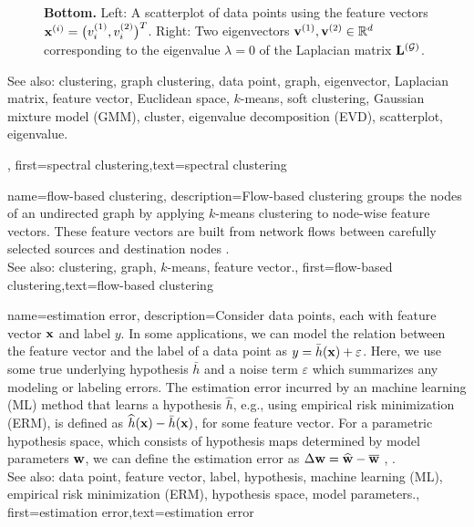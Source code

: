 {{\begin{figure}[H]
\begin{center}
{					{\bf Bottom.} Left: A scatterplot of data points using the feature vectors 
					${\bf x}^{(i)} = \big( v^{(1)}_{i},v^{(2)}_{i} \big)^{T}$. 
					Right: Two eigenvectors ${\bf v}^{(1)},{\bf v}^{(2)} \in \mathbb{R}^{d}$ 
					corresponding to the eigenvalue $\lambda=0$ of the Laplacian matrix ${\bf L}^{(\mathcal{G})}$. 
					} 
			\end{center}
		\end{figure}
		See also: clustering, graph clustering, data point, graph, eigenvector, Laplacian matrix, feature vector, Euclidean space, $k$-means, soft clustering, Gaussian mixture model (GMM), cluster, eigenvalue decomposition (EVD), scatterplot, eigenvalue.
	\newpage}, 
	first={spectral clustering},text={spectral clustering} 
}

{name={flow-based clustering},
	description={Flow-based clustering groups the nodes 
		of an undirected graph by applying $k$-means clustering to node-wise 
		feature vectors. These feature vectors are built from network flows between 
		carefully selected sources and destination nodes \cite{FlowSpecClustering2021}. 
					\\ 
		See also: clustering, graph, $k$-means, feature vector.}, 
	first={flow-based clustering},text={flow-based clustering} 
}



{name={estimation error},
	description={Consider data points, each with feature vector ${\bf x}$ and label 
		$y$. In some applications, we can model the relation between the feature vector and the label
		of a data point as $y = \bar{h}({\bf x}) + \varepsilon$. Here, we 
		use some true underlying hypothesis $\bar{h}$ and a noise term $\varepsilon$ 
		which summarizes any modeling or labeling errors. The estimation error incurred by an machine learning (ML) 
		method that learns a hypothesis $\widehat{h}$, e.g., using empirical risk minimization (ERM), is defined as 
		$\widehat{h}({\bf x}) - \bar{h}({\bf x})$, for some feature vector. 
		For a parametric hypothesis space, which consists of hypothesis maps determined by 
		model parameters ${\bf w}$, we can define the estimation error as $\Delta {\bf w} = \widehat{{\bf w}} - \overline{{\bf w}}$ \cite{kay}, \cite{hastie01statisticallearning}.
					\\ 
		See also: data point, feature vector, label, hypothesis, machine learning (ML), empirical risk minimization (ERM), hypothesis space, model parameters.},
	first={estimation error},text={estimation error} 
}


